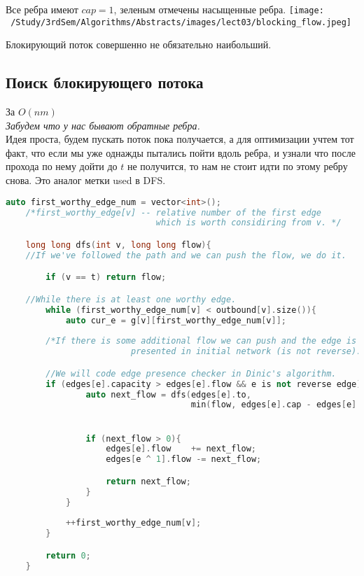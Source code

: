 \begin{example}
	Все ребра имеют $cap = 1$, зеленым отмечены насыщенные ребра.
	\texttt{[image: ~/Study/3rdSem/Algorithms/Abstracts/images/lect03/blocking\_flow.jpeg]}
\end{example}

\begin{note}
	Блокирующий поток совершенно не обязательно наибольший.	
\end{note}

\subsection{Поиск блокирующего потока}

За $O(nm)$ \\

\textit{Забудем что у нас бывают обратные ребра.} \\
Идея проста, будем пускать поток пока получается, а для оптимизации учтем тот факт, что если мы уже однажды пытались пойти вдоль ребра, и узнали что после прохода по нему дойти до $t$ не получится, то нам не стоит идти по этому ребру снова. Это аналог метки used в DFS.

\newpage 

\begin{lstlisting}[language = C++]
	auto first_worthy_edge_num = vector<int>(); 
	/*first_worthy_edge[v] -- relative number of the first edge 
							  which is worth considiring from v. */

	long long dfs(int v, long long flow){
	//If we've followed the path and we can push the flow, we do it.

		if (v == t) return flow;

	//While there is at least one worthy edge.
		while (first_worthy_edge_num[v] < outbound[v].size()){
			auto cur_e = g[v][first_worthy_edge_num[v]];
		
		/*If there is some additional flow we can push and the edge is 
						 presented in initial network (is not reverse). */

		//We will code edge presence checker in Dinic's algorithm.
		if (edges[e].capacity > edges[e].flow && e is not reverse edge){
				auto next_flow = dfs(edges[e].to, 
				                     min(flow, edges[e].cap - edges[e].flow));


				if (next_flow > 0){
					edges[e].flow	 += next_flow;
					edges[e ^ 1].flow -= next_flow;

					return next_flow;
				}
			}
		
			++first_worthy_edge_num[v];
		}

		return 0;
	}
\end{lstlisting}

